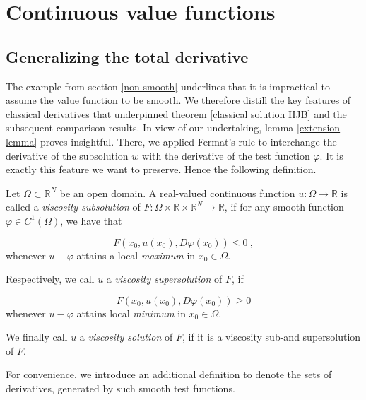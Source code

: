
\chapter{Continuous value functions}

	\section{Generalizing the total derivative}
	
	The example from section \ref{non-smooth} underlines that it is impractical to assume the value function to be smooth. We therefore distill the key features of classical derivatives that underpinned theorem \ref{classical solution HJB} and the subsequent comparison results. In view of our undertaking,  lemma \ref{extension lemma} proves insightful. There, we applied Fermat's rule to interchange the derivative of the subsolution $ w $ with the derivative of the test function $ \varphi $. It is exactly this feature we want to preserve. Hence the following definition.
	
	\begin{definition}
		Let $ \Omega \subset \mathbb{R}^N $ be an open domain. A real-valued continuous function $ u : \Omega \to \mathbb{R} $ is called a \emph{viscosity subsolution} of $ F : \Omega \times \mathbb{R} \times \mathbb{R}^N \to \mathbb{R} $, if for any smooth function $ \varphi \in C^1(\Omega) $, we have that
		
		\begin{equation}
			\label{def viscosity subsolution}
			F(x_0, u(x_0), D \varphi(x_0)) \leq 0 \ ,
		\end{equation}
		whenever $ u - \varphi $ attains a local \emph{maximum} in $ x_0 \in \Omega $.
		
		Respectively, we call $ u $ a \emph{viscosity supersolution} of $ F $, if
		
		\begin{equation}
			\label{def viscosity supersolution}
			F(x_0, u(x_0), D\varphi(x_0)) \geq 0
		\end{equation}
		whenever $ u - \varphi $ attains local \emph{minimum} in $ x_0 \in \Omega $. 
		
		We finally call $ u $ a \emph{viscosity solution} of $ F $, if it is a viscosity sub-and supersolution of $ F $.
	\end{definition}

	For convenience, we introduce an additional definition to denote the sets of derivatives, generated by such smooth test functions.
	

